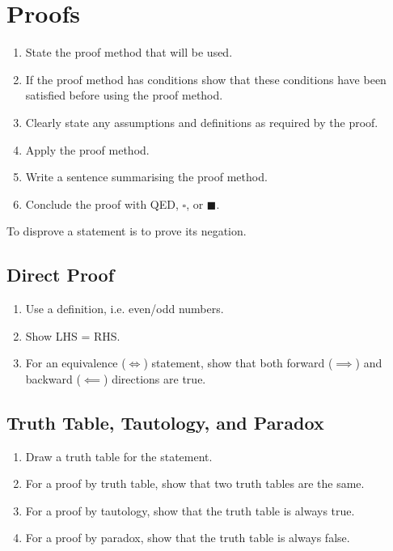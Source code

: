 \documentclass{article}
\begin{document}
\section{Proofs}
\begin{tcolorboxlarge}[title={Proof Structure}]
    \begin{enumerate}[leftmargin=3.5em, itemsep=0.2em, topsep=0.35em]
        \item State the proof method that will be used.
        \item If the proof method has conditions show that these conditions have been satisfied before using the proof method.
        \item Clearly state any assumptions and definitions as required by the proof.
        \item Apply the proof method.
        \item Write a sentence summarising the proof method.
        \item Conclude the proof with QED, $\square$, or $\blacksquare$.
    \end{enumerate}
\end{tcolorboxlarge}
\begin{note}[Disprove]
    To disprove a statement is to prove its negation.
\end{note}
%
\subsection{Direct Proof}
\begin{enumerate}
    \item Use a definition, i.e. even/odd numbers.
    \item Show LHS = RHS.
    \item For an equivalence ($\iff$) statement, show that both forward ($\implies$) and backward ($\impliedby$) directions are true.
\end{enumerate}
%
\subsection{Truth Table, Tautology, and Paradox}
\begin{enumerate}
    \item Draw a truth table for the statement.
    \item For a proof by truth table, show that two truth tables are the same.
    \item For a proof by tautology, show that the truth table is always true.
    \item For a proof by paradox, show that the truth table is always false.
\end{enumerate}
%
\end{document}
